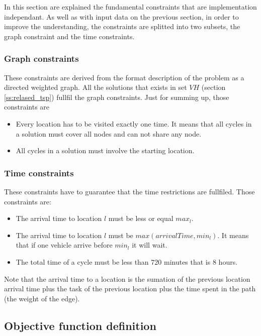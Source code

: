 \documentclass[]{report}
\begin{document}
In this section are explained the fundamental constraints that are implementation independant. As well as with input data on the previous section, in order to improve the understanding, the constraints are splitted into two subsets, the graph constraint and the time constraints.

\subsubsection{Graph constraints}

These constraints are derived from the format description of the problem as a directed weighted graph. All the solutions that exists in set $VH$ (section \ref{ss:relased_tsp}) fullfil the graph constraints. Just for summing up, those constraints are
\begin{itemize}
	\item Every location has to be visited exactly one time. It means that all cycles in a solution must cover all nodes and can not share any node.
	\item All cycles in a solution must involve the starting location.
\end{itemize}

\subsubsection{Time constraints}\label{ss:time_constraints}
These constraints have to guarantee that the time restrictions are fullfiled. Those constraints are:
\begin{itemize}
	\item The arrival time to location $l$ must be less or equal $max_{l}$.
	\item The arrival time to location $l$ must be $max(arrivalTime, min_{l})$. It means that if one vehicle arrive before  $min_{l}$ it will wait.
	\item The total time of a cycle must be less than 720 minutes that is 8 hours.
\end{itemize}

Note that the arrival time to a location is the sumation of the previous location arrival time plus the task of the previous location plus the time spent in the path (the weight of the edge).

\subsection{Objective function definition}\label{ss:objective_function}
\end{document}
